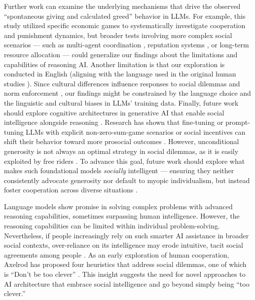 Further work can examine the underlying mechanisms that drive the observed “spontaneous giving and calculated greed” behavior in LLMs.
For example, this study utilized specific economic games to systematically investigate cooperation and punishment dynamics, but broader tests involving more complex social scenarios --- such as multi-agent coordination \cite{schwarting2019social}, reputation systems \cite{sommerfeld2007gossip}, or long-term resource allocation \cite{shirado2019resource} --- could generalize our findings about the limitations and capabilities of reasoning AI.
Another limitation is that our exploration is conducted in English (aligning with the language used in the original human studies \cite{rand2012spontaneous, peysakhovich2014humans}).
Since cultural differences influence responses to social dilemmas and norm enforcement \cite{henrich2001search, schulz2019church,gelfand2011differences}, our findings might be constrained by the language choice and the linguistic and cultural biases in LLMs’ training data.
Finally, future work should explore cognitive architectures in generative AI that enable social intelligence alongside reasoning \cite{sumers2023cognitive}.
Research has shown that fine-tuning or prompt-tuning LLMs with explicit non-zero-sum-game scenarios or social incentives can shift their behavior toward more prosocial outcomes \cite{xie2023defending, phelps2023investigating, piatti2025cooperate}.
However, unconditional generosity is not always an optimal strategy in social dilemmas, as it is easily exploited by free riders \cite{axelrod1984pg, nowak2006evolutionary}.
To advance this goal, future work should explore what makes such foundational models \textit{socially} intelligent --- ensuring they neither consistently advocate generosity nor default to myopic individualism, but instead foster cooperation across diverse situations \cite{shirado2020network}. 

Language models show promise in solving complex problems with advanced reasoning capabilities, sometimes surpassing human intelligence.
However, the reasoning capabilities can be limited within individual problem-solving.
Nevertheless, if people increasingly rely on such smarter AI assistance in broader social contexts, over-reliance on its intelligence may erode intuitive, tacit social agreements among people \cite{shirado2023emergence}.
As an early exploration of human cooperation, Axelrod has proposed four heuristics that address social dilemmas, one of which is “Don’t be too clever” \cite{axelrod1984pg}.
This insight suggests the need for novel approaches to AI architecture that embrace social intelligence and go beyond simply being “too clever.”